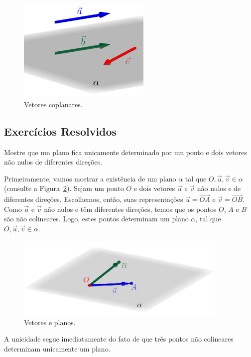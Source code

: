 \begin{ex}
  \begin{figure}[h]
    \centering
    \includegraphics[width=2.5in]{./cap_vetor/dados/fig_vetores_coplanares/fig.png}
    \caption{Vetores coplanares.}
    \label{cap_vetor_sec_vetor:fig:vetores_coplanares}
  \end{figure}
  
\end{ex}


\subsection{Exercícios Resolvidos}

\begin{exeresol}
  Mostre que um plano fica unicamente determinado por um ponto e dois vetores não nulos de diferentes direções.
\end{exeresol}
\begin{resol}
  Primeiramente, vamos mostrar a existência de um plano $\alpha$ tal que $O, \vec{u}, \vec{v}\in\alpha$ (consulte a Figura~\ref{cap_vetor_sec_vetor:fig:vetores_e_planos}). Sejam um ponto $O$ e dois vetores $\vec{u}$ e $\vec{v}$ não nulos e de diferentes direções. Escolhemos, então, suas representações $\vec{u} = \overrightarrow{OA}$ e $\vec{v} = \overrightarrow{OB}$. Como $\vec{u}$ e $\vec{v}$ não nulos e têm diferentes direções, temos que os pontos $O$, $A$ e $B$ são não colineares. Logo, estes pontos determinam um plano $\alpha$, tal que $O, \vec{u}, \vec{v} \in \alpha$.

  \begin{figure}[h!]
    \centering
    \includegraphics[width=4in]{./cap_vetor/dados/fig_vetores_e_planos/fig.png}
    \caption{Vetores e planos.}
    \label{cap_vetor_sec_vetor:fig:vetores_e_planos}
  \end{figure}
  
  A unicidade segue imediatamente do fato de que três pontos não colineares determinam unicamente um plano.

\end{resol}

